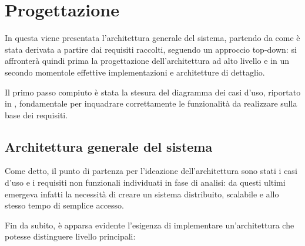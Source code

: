 \section{Progettazione}\label{sec:project}




In questa  viene presentata l'architettura generale del sistema,
partendo da come è stata derivata a partire dai requisiti raccolti, seguendo un approccio top-down:
si affronterà quindi prima la progettazione dell'architettura ad alto livello
e in un secondo momentole effettive implementazioni e architetture di dettaglio.

Il primo passo compiuto è stata la stesura del diagramma dei casi d'uso, riportato in ,
fondamentale per inquadrare correttamente le funzionalità da realizzare sulla base dei requisiti.

\subsection{Architettura generale del sistema}

Come detto, il punto di partenza per l'ideazione dell'architettura sono stati i casi d'uso e i requisiti non funzionali individuati in fase di analisi:
da questi ultimi emergeva infatti la necessità di creare un sistema distribuito, scalabile e allo stesso tempo di semplice accesso.

Fin da subito, è apparsa evidente l'esigenza di implementare un'architettura che potesse distinguere livello principali:

